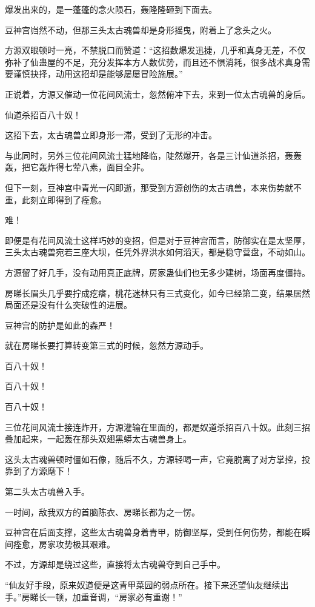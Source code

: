 \begin{this_body}
爆发出来的，是一蓬蓬的念火陨石，轰隆隆砸到下面去。

豆神宫岿然不动，但那三头太古魂兽却是身形摇曳，附着上了念头之火。

方源双眼顿时一亮，不禁脱口而赞道：“这招数爆发迅捷，几乎和真身无差，不仅弥补了仙蛊屋的不足，充分发挥本方人数优势，而且还不惧消耗，很多战术真身需要谨慎抉择，动用这招却是能够屡屡冒险施展。”

正说着，方源又催动一位花间风流士，忽然俯冲下去，来到一位太古魂兽的身后。

仙道杀招百八十奴！

这招下去，太古魂兽立即身形一滞，受到了无形的冲击。

与此同时，另外三位花间风流士猛地降临，陡然爆开，各是三计仙道杀招，轰轰轰，把它轰炸得七荤八素，面目全非。

但下一刻，豆神宫中青光一闪即逝，那受到方源创伤的太古魂兽，本来伤势就不重，此刻立即得到了痊愈。

难！

即便是有花间风流士这样巧妙的变招，但是对于豆神宫而言，防御实在是太坚厚，三头太古魂兽宛若三座大坝，任凭外界洪水如何滔天，都是稳守营盘，不动如山。

方源留了好几手，没有动用真正底牌，房家蛊仙们也无多少建树，场面再度僵持。

房睇长眉头几乎要拧成疙瘩，桃花迷林只有三式变化，如今已经第二变，结果居然局面还是没有什么突破性的进展。

豆神宫的防护是如此的森严！

就在房睇长要打算转变第三式的时候，忽然方源动手。

百八十奴！

百八十奴！

百八十奴！

三位花间风流士接连炸开，方源灌输在里面的，都是奴道杀招百八十奴。此刻三招叠加起来，一起轰在那头双翅黑蟒太古魂兽身上。

这头太古魂兽顿时僵如石像，随后不久，方源轻喝一声，它竟脱离了对方掌控，投靠到了方源麾下！

第二头太古魂兽入手。

一时间，敌我双方的首脑陈衣、房睇长都为之一愣。

豆神宫在后面支撑，这些太古魂兽身着青甲，防御坚厚，受到任何伤势，都能在瞬间痊愈，房家攻势极其艰难。

不过，方源却是绕过这些，直接将太古魂兽夺到自己手中。

“仙友好手段，原来奴道便是这青甲菜园的弱点所在。接下来还望仙友继续出手。”房睇长一顿，加重音调，“房家必有重谢！”


\end{this_body}
